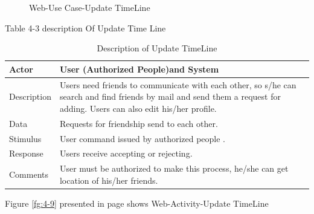 \documentclass[12pt,a4paper,class,twoside,openany]{report}
\begin{document}
{\begin{figure}
\begin{center}
{}
\caption{Web-Use Case-Update TimeLine}
\label{fg:4-8}
\end{center}
\end{figure}
Table 4-3 description Of Update Time Line
\begin{table}
\centering
\begin{tabular}{|l| p{10 cm} |}
\hline
Actor & User (Authorized People)and System \\ \hline
Description & Users need friends to communicate with each other, so s/he can search and find friends by mail and send them a request for adding. Users can also edit his/her profile.\\ \hline
Data & Requests for friendship send to each other. \\ \hline
Stimulus &User command issued by authorized people . \\ \hline
Response & Users receive accepting or rejecting. \\ \hline
Comments & User must be authorized to make this process, he/she can get location of his/her friends.\\ \hline
\end{tabular}
\caption{ Description of Update TimeLine}
\label{tab:table 4-3}
\end{table}
Figure \ref{fg:4-9} presented in page \pageref{fg:4-9} shows Web-Activity-Update TimeLine
\begin{figure}
\begin{center}
\end{center}
\end{figure}}
\end{document}
